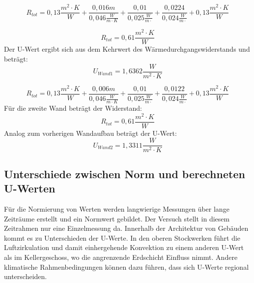 $$R_{tot}=0,13\frac{m^2 \cdot K}{W}+ \frac{0,016m}{0,046\frac{W}{m\cdot K}}+ \frac{0,01}{0,025\frac{W}{m\cdot}} +\frac{0,0224}{0,024\frac{W}{m\cdot}} +0,13\frac{m^2 \cdot K}{W}$$

$$R_{tot}=0,61\frac{m^2 \cdot K}{W}$$
Der U-Wert ergibt sich aus dem Kehrwert des Wärmedurchgangswiderstands und beträgt:
$$U_{Wand 1}=1,6362 \frac{W}{m^2 \cdot K}$$

$$R_{tot}=0,13\frac{m^2 \cdot K}{W}+ \frac{0,006m}{0,046\frac{W}{m\cdot K}}+ \frac{0,01}{0,025\frac{W}{m\cdot}} +\frac{0,0122}{0,024\frac{W}{m\cdot}} +0,13\frac{m^2 \cdot K}{W}$$
Für die zweite Wand beträgt der Widerstand:
$$R_{tot}=0,61\frac{m^2 \cdot K}{W}$$
Analog zum vorherigen Wandaufbau beträgt der U-Wert:
$$U_{Wand 2}=1,3311 \frac{W}{m^2 \cdot K}$$



\subsection{Unterschiede zwischen Norm und berechneten U-Werten}
Für die Normierung von Werten werden langwierige Messungen über lange Zeiträume erstellt und ein Normwert gebildet.
Der Versuch stellt in diesem Zeitrahmen nur eine Einzelmessung da. 
Innerhalb der Architektur von Gebäuden kommt es zu Unterschieden der U-Werte.
In den oberen Stockwerken führt die Luftzirkulation und damit einhergehende Konvektion zu einem anderen U-Wert als im Kellergeschoss, wo die angrenzende Erdschicht Einfluss nimmt.
Andere klimatische Rahmenbedingungen können dazu führen, dass sich U-Werte regional unterscheiden. 
